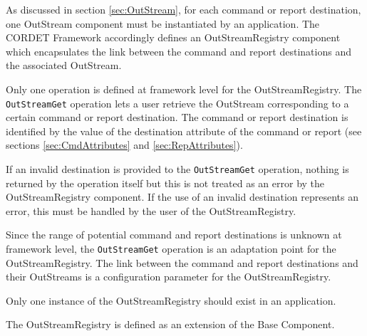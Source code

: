 As discussed in section \ref{sec:OutStream}, for each command or report destination, one OutStream component must be instantiated by an application. The CORDET Framework accordingly defines an OutStreamRegistry component which encapsulates the link between the command and report destinations and the associated OutStream.  

Only one operation is defined at framework level for the OutStreamRegistry. The \texttt{OutStreamGet} operation lets a user retrieve the OutStream corresponding to a certain command or report destination. The command or report destination is identified by the value of the destination attribute of the command or report (see sections \ref{sec:CmdAttributes} and \ref{sec:RepAttributes}). 

If an invalid destination is provided to the \texttt{OutStreamGet} operation, nothing is returned by the operation itself but this is not treated as an error by the OutStreamRegistry component. If the use of an invalid destination represents an error, this must be handled by the user of the OutStreamRegistry.

Since the range of potential command and report destinations is unknown at framework level, the \texttt{OutStreamGet} operation is an adaptation point for the OutStreamRegistry. The link between the command and report destinations and their OutStreams is a configuration parameter for the OutStreamRegistry. 

Only one instance of the OutStreamRegistry should exist in an application. 

The OutStreamRegistry is defined as an extension of the Base Component.
